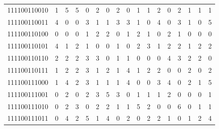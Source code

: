 \documentclass[10pt,a4paper]{article}
\begin{document}
\begin{longtable}{ |c|c|c|c|c|c|c|c|c|c|c|c|c|c|c|c|c| }
    111100110010              & 1                            & 5                                & 5                            & 0                              & 2   & 0   & 2   & 0   & 1   & 1   & 2   & 0   & 2   & 1   & 1   & 1   \\
    111100110011              & 4                            & 0                                & 0                            & 3                              & 1   & 1   & 3   & 3   & 1   & 0   & 4   & 0   & 3   & 1   & 0   & 5   \\
    111100110100              & 0                            & 0                                & 0                            & 1                              & 2   & 2   & 0   & 1   & 2   & 1   & 0   & 2   & 1   & 0   & 0   & 0   \\
    111100110101              & 4                            & 1                                & 2                            & 1                              & 0   & 0   & 1   & 0   & 2   & 3   & 1   & 2   & 2   & 1   & 2   & 2   \\
    111100110110              & 2                            & 2                                & 2                            & 3                              & 3   & 0   & 1   & 1   & 0   & 0   & 0   & 4   & 3   & 2   & 2   & 0   \\
    111100110111              & 1                            & 2                                & 2                            & 3                              & 1   & 2   & 1   & 4   & 1   & 2   & 2   & 0   & 0   & 2   & 0   & 2   \\
    111100111000              & 1                            & 4                                & 2                            & 3                              & 1   & 1   & 1   & 4   & 0   & 0   & 3   & 4   & 0   & 2   & 1   & 5   \\
    111100111001              & 0                            & 2                                & 0                            & 2                              & 3   & 5   & 3   & 0   & 1   & 1   & 1   & 2   & 0   & 0   & 0   & 1   \\
    111100111010              & 0                            & 2                                & 3                            & 0                              & 2   & 2   & 1   & 1   & 5   & 2   & 0   & 0   & 6   & 0   & 1   & 1   \\
    111100111011              & 0                            & 4                                & 2                            & 5                              & 1   & 4   & 0   & 2   & 0   & 2   & 2   & 1   & 0   & 1   & 2   & 4   \\

\end{longtable}
\end{document}
